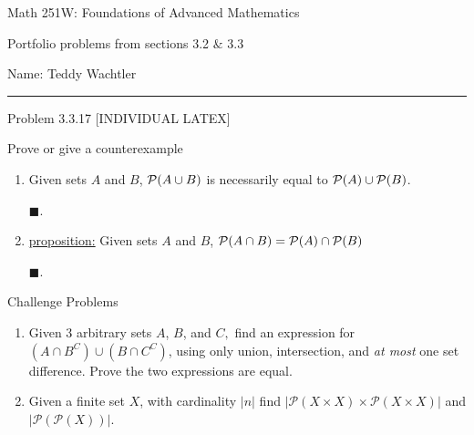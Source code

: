 \documentclass{article}
\theoremstyle{definition}
\renewcommand{\qed}{\blacksquare}
\begin{document}
	\begin{center}
		\Large{Math 251W: Foundations of Advanced Mathematics}

		\normalsize Portfolio problems from sections 3.2 $\&$ 3.3

		\hfill Name: Teddy Wachtler
		\hrule
		\vspace{0.4cm}
		\vspace{0.75cm}
	\end{center}


	\noindent Problem 3.3.17 [INDIVIDUAL LATEX]
	\vspace{0.3cm}

	Prove or give a counterexample

	\begin{enumerate}
		\item[1]
		Given sets $A$ and $B$, ${\cal P}(A\cup B)$ is necessarily equal to ${\cal P}(A)\cup{\cal P}(B)$.
		\vspace{.2cm}


		$\qed$.

		\vspace{.15cm}

		\item[2] \underline{proposition:}
		Given sets $A$ and $B$, ${\cal P}(A\cap B)={\cal P}(A)\cap{\cal P}(B)$
		\vspace{.2cm}


		$\qed$.

		\vspace{.15cm}

	\end{enumerate}
	\vspace{1cm}


	\noindent Challenge Problems  \vspace{0.3cm}

	\begin{enumerate}
		\item[1]
		Given 3 arbitrary sets $A$, $B$, and $C,$ find an expression for $(A\cap B^C)\cup (B\cap C^C)$, using only union, intersection, and \emph{at most} one set difference.
		Prove the two expressions are equal.

		\item[2]
		Given a finite set $X$, with cardinality $|n|$ find $|\mathcal{P}(X\times X)\times\mathcal{P}(X\times X)|$ and $|\mathcal{P}(\mathcal{P}(X))|.$

	\end{enumerate}

\end{document}
